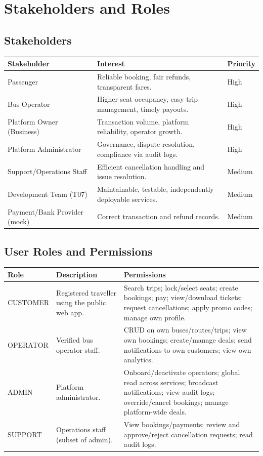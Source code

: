 \documentclass[11pt,a4paper]{article}
\newcommand{\rowstyle}{\rowcolor{headergray}}
\begin{document}
\section{Stakeholders and Roles}

\subsection{Stakeholders}
\begin{longtable}{p{3.6cm} Y p{2.2cm}}
\toprule
\rowstyle \textbf{Stakeholder} & \textbf{Interest} & \textbf{Priority} \\
\midrule
\endhead
Passenger & Reliable booking, fair refunds, transparent fares. & High \\
Bus Operator & Higher seat occupancy, easy trip management, timely payouts. & High \\
Platform Owner (Business) & Transaction volume, platform reliability, operator growth. & High \\
Platform Administrator & Governance, dispute resolution, compliance via audit logs. & High \\
Support/Operations Staff & Efficient cancellation handling and issue resolution. & Medium \\
Development Team (T07) & Maintainable, testable, independently deployable services. & Medium \\
Payment/Bank Provider (mock) & Correct transaction and refund records. & Medium \\
\bottomrule
\end{longtable}

\subsection{User Roles and Permissions}
\begin{longtable}{p{2.6cm} Y Y}
\toprule
\rowstyle \textbf{Role} & \textbf{Description} & \textbf{Permissions} \\
\midrule
\endhead
CUSTOMER & Registered traveller using the public web app. & Search trips; lock/select seats; create bookings; pay; view/download tickets; request cancellations; apply promo codes; manage own profile. \\
OPERATOR & Verified bus operator staff. & CRUD on own buses/routes/trips; view own bookings; create/manage deals; send notifications to own customers; view own analytics. \\
ADMIN & Platform administrator. & Onboard/deactivate operators; global read across services; broadcast notifications; view audit logs; override/cancel bookings; manage platform-wide deals. \\
SUPPORT & Operations staff (subset of admin). & View bookings/payments; review and approve/reject cancellation requests; read audit logs. \\
\bottomrule
\end{longtable}
\end{document}

